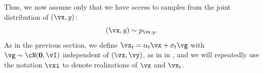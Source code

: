 \documentclass[../../book-main.tex]{subfiles}
\begin{document}
Thus, we now assume only that we have access to samples from the joint
distribution of $(\vx, y)$:
\begin{equation}
  (\vx, y) \sim p_{\vx, y}.
\end{equation}
As in the previous section, we define $\vx_t = \alpha_t \vx + \sigma_t \vg$
with $\vg \sim \cN(\Zero, \vI)$ independent of $(\vx, \vy)$, as in
 in ,
and we will repeatedly use the notation $\vxi$ to denote realizations of $\vx$
and $\vx_t$.
\end{document}

